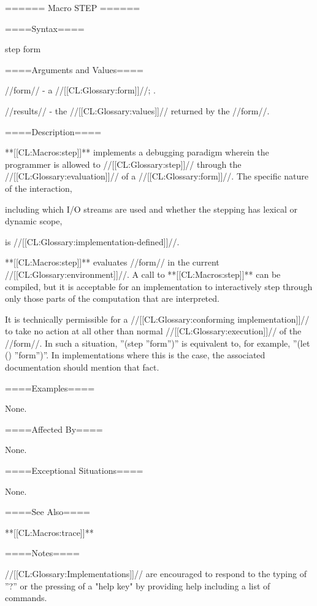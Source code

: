 ====== Macro STEP ======

====Syntax====

\DefmacWithValues step {form} {}

====Arguments and Values====

//form// - a //[[CL:Glossary:form]]//; \evalspecial.

//results// - the //[[CL:Glossary:values]]// returned by the //form//.

====Description====

**[[CL:Macros:step]]** implements a debugging paradigm wherein the programmer is allowed to //[[CL:Glossary:step]]// through the //[[CL:Glossary:evaluation]]// of a //[[CL:Glossary:form]]//. The specific nature of the interaction,

including which I/O streams are used and whether the stepping has lexical or dynamic scope,

is //[[CL:Glossary:implementation-defined]]//.

**[[CL:Macros:step]]** evaluates //form// in the current //[[CL:Glossary:environment]]//. A call to **[[CL:Macros:step]]** can be compiled, but it is acceptable for an implementation to interactively step through only those parts of the computation that are interpreted.

It is technically permissible for a //[[CL:Glossary:conforming implementation]]// to take no action at all other than normal //[[CL:Glossary:execution]]// of the //form//. In such a situation, ''(step ''form'')'' is equivalent to, for example, ''(let () ''form'')''. In implementations where this is the case, the associated documentation should mention that fact.

====Examples====

None.

====Affected By====

None.

====Exceptional Situations====

None.

====See Also====

**[[CL:Macros:trace]]**

====Notes====

//[[CL:Glossary:Implementations]]// are encouraged to respond to the typing of ''?'' or the pressing of a "help key" by providing help including a list of commands.

    
